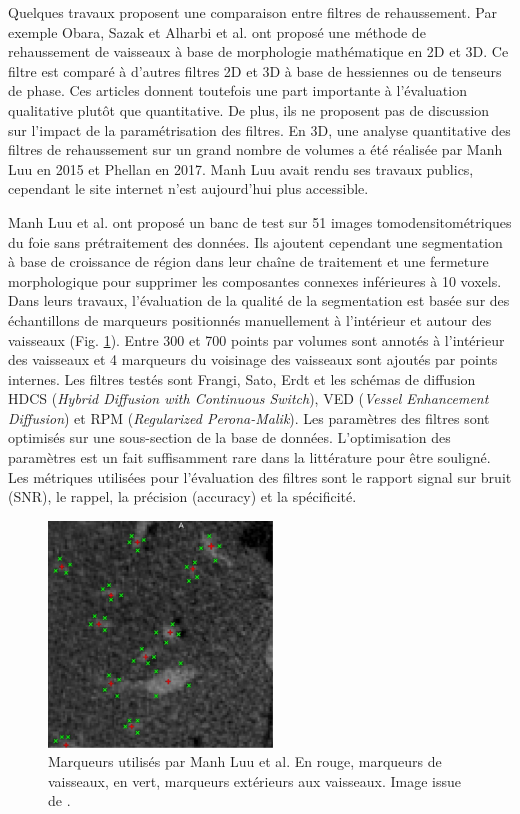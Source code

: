  Quelques travaux proposent une comparaison entre filtres de rehaussement. Par exemple Obara, Sazak et Alharbi et al. \cite{Alharbi2018_TP_2D_3D} \cite{Sazak2019_bowler_hat_2D}  ont proposé une méthode de rehaussement de vaisseaux à base de morphologie mathématique en 2D et 3D. Ce filtre est comparé à d'autres filtres 2D et 3D à base de hessiennes ou de tenseurs de phase. Ces articles donnent toutefois une part importante à l'évaluation qualitative plutôt que quantitative. De plus, ils ne proposent pas de discussion sur l'impact de la paramétrisation des filtres. En 3D, une analyse quantitative des filtres de rehaussement sur un grand nombre de volumes a été réalisée par Manh Luu en 2015 \cite{Luu2015_liver_vesselness_comparison} et Phellan \cite{Phellan2017_Brain_vesselness_comparison} en 2017. Manh Luu avait rendu ses travaux publics, cependant le site internet n'est aujourd'hui plus accessible.

Manh Luu et al. \cite{Luu2015_liver_vesselness_comparison} ont proposé un banc de test sur 51 images tomodensitométriques du foie sans prétraitement des données. Ils ajoutent cependant une segmentation à base de croissance de région dans leur chaîne de traitement et une fermeture morphologique pour supprimer les composantes connexes inférieures à 10 voxels. Dans leurs travaux, l'évaluation de la qualité de la segmentation est basée sur des échantillons de marqueurs positionnés manuellement à l'intérieur et autour des vaisseaux (Fig. \ref{fig:ManhLuu_markers}). Entre 300 et 700 points par volumes sont annotés à l'intérieur des vaisseaux et 4 marqueurs du voisinage des vaisseaux sont ajoutés par points internes. Les filtres testés sont Frangi, Sato, Erdt et les schémas de diffusion HDCS (\textit{Hybrid Diffusion with Continuous Switch}), VED (\textit{Vessel Enhancement Diffusion}) et RPM (\textit{Regularized Perona-Malik}). Les paramètres des filtres sont optimisés sur une sous-section de la base de données. L'optimisation des paramètres est un fait suffisamment rare dans la littérature pour être souligné. Les métriques utilisées pour l'évaluation des filtres sont le rapport signal sur bruit (SNR), le rappel, la précision (accuracy) et la spécificité.

\begin{figure}[!ht]
  \centering
  \includegraphics[height=6cm]{Images/ManhLuu_markers.png}
  \caption{Marqueurs utilisés par Manh Luu et al. En rouge, marqueurs de vaisseaux, en vert, marqueurs extérieurs aux vaisseaux. Image issue de \cite{Luu2015_liver_vesselness_comparison}. }
  \label{fig:ManhLuu_markers}
\end{figure}

